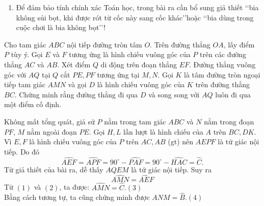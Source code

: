 \begin{bt}
{\begin{nx}
\begin{enumerate}[\bf 1.]
\item Để đảm bảo tính chính xác Toán học, trong bài ra cần bổ sung giả thiết \lq\lq bia không sủi bọt, khi được rót từ cốc này sang cốc khác\rq\rq  hoặc \lq\lq bia dùng trong cuộc chơi là bia không bọt\rq\rq!
\end{enumerate}
\end{nx}
}
\end{bt}


\begin{bt}%
Cho tam giác $ ABC $ nội tiếp đường tròn tâm $ O $. Trên đường thẳng $ OA $, lấy điểm  $ P $ tùy ý. Gọi $ E $ và $ F $ tương ứng là hình chiếu vuông góc của $ P $ trên các đường thẳng $ AC $ và $ AB $. Xét điểm $ Q $ di động trên đoạn thẳng $ EF $. Đường thẳng vuông góc với $ AQ $ tại $ Q $ cắt $ PE, PF $ tương ứng tại $ M, N $. Gọi $ K $ là tâm đường tròn ngoại tiếp tam giác $ AMN $ và gọi $ D $ là hình chiếu vuông góc của $ K $ trên đường thẳng $ BC $. Chứng minh rằng đường thẳng đi qua $ D $ và song song với $ AQ $ luôn đi qua một điểm cố định.
\loigiai
{Không mất tổng quát, giả sử $P$ nằm trong tam giác $ABC$ và $N$ nằm trong đoạn $PF$, $M$ nằm ngoài đoạn $PE$.
Gọi $H,L$ lần lượt là hình chiếu của $A$ trên $BC,DK$. Vì $E,F$ là hình chiếu vuông góc của $P$ trên $AC,AB$ (gt) nên $AEPF$ là tứ giác nội tiếp. Do đó \[\widehat{AEF}=\widehat{APF}=90^\circ -\widehat{PAF}=90^\circ-\widehat{HAC}=\widehat{C}.\tag{1}\]Từ giả thiết của bài ra, dễ thấy $AQEM$ là tứ giác nội tiếp. Suy ra \[\widehat{AMN}=\widehat{AEF}\tag{2}\]
Từ $(1)$ và $(2)$, ta được: $\widehat{AMN}=\widehat{C}.$\hfill $(3)$\\Bằng cách tương tự, ta cũng chứng minh được $\widehat{ANM}=\widehat{B}$.\hfill $(4)$
\begin{center}
\end{center}}
\end{bt}
